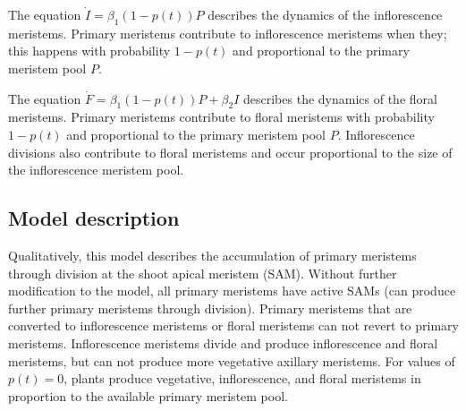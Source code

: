 \documentclass[12pt, oneside,titlepage]{article}   	%
\begin{document}
The equation $\dot{I} = \beta_1 ( 1-p(t) ) P $ describes the dynamics of the inflorescence meristems. Primary meristems contribute to inflorescence meristems when they; this happens with probability $1-p(t)$ and proportional to the primary meristem pool $P$. 

The equation $\dot{F} = \beta_1 ( 1-p(t) ) P + \beta_2 I$ describes the dynamics of the floral meristems. Primary meristems contribute to floral meristems with probability $1-p(t)$ and proportional to the primary meristem pool $P$. Inflorescence divisions also contribute to floral meristems and occur proportional to the size of the inflorescence meristem pool.


\subsection{Model description}
Qualitatively, this model describes the accumulation of primary meristems through division at the shoot apical meristem (SAM). Without further modification to the model, all primary meristems have active SAMs (can produce further primary meristems through division). Primary meristems that are converted to inflorescence meristems or floral meristems can not revert to primary meristems. Inflorescence meristems divide and produce inflorescence and floral meristems, but can not produce more vegetative axillary meristems. For values of $p(t)=0$, plants produce vegetative, inflorescence, and floral meristems in proportion to the available primary meristem pool. 
\end{document}
